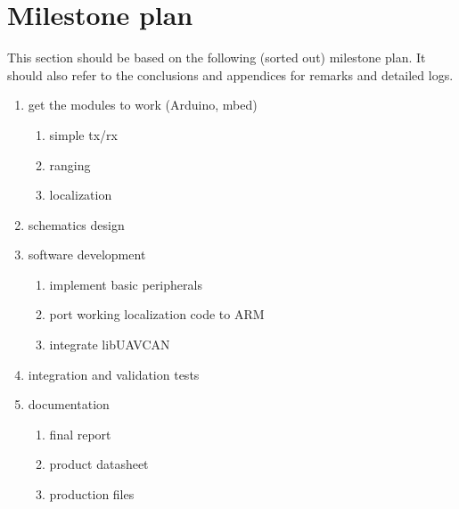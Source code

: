 \section{Milestone plan}
This section should be based on the following (sorted out) milestone plan. It should also refer to the conclusions and appendices for remarks and detailed logs.

\begin{enumerate}
\item get the modules to work (Arduino, mbed)
	\begin{enumerate}
	\item simple tx/rx
	\item ranging
	\item localization
	\end{enumerate}
\item schematics design
\item software development
	\begin{enumerate}
	\item implement basic peripherals
	\item port working localization code to ARM
	\item integrate libUAVCAN 
	\end{enumerate}
\item integration and validation tests
\item documentation 
	\begin{enumerate}
	\item final report
	\item product datasheet
	\item production files
	\end{enumerate}
\end{enumerate}
